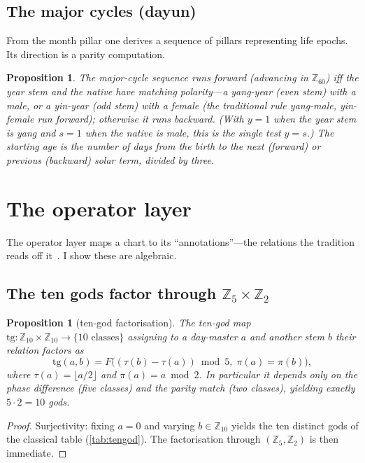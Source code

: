 \documentclass[11pt,a4paper]{article}
\newtheorem{proposition}[theorem]{Proposition}
\theoremstyle{definition}
\theoremstyle{remark}
\newcommand{\Z}{\mathbb{Z}}
\begin{document}
\subsection{The major cycles (dayun)}
From the month pillar one derives a sequence of pillars representing life epochs. Its direction is a parity computation.

\begin{proposition}\label{prop:dayun}
The major-cycle sequence runs forward (advancing in $\Z_{60}$) iff the year stem and the native have matching polarity---a yang-year (even stem) with a male, or a yin-year (odd stem) with a female (the traditional rule \emph{yang-male, yin-female run forward}); otherwise it runs backward. (With $y=1$ when the year stem is yang and $s=1$ when the native is male, this is the single test $y=s$.) The starting age is the number of days from the birth to the next (forward) or previous (backward) solar term, divided by three.
\end{proposition}

\section{The operator layer}\label{sec:operators}

The operator layer maps a chart to its ``annotations''---the relations the tradition reads off it~\cite{yuanhai}. I show these are algebraic.

\subsection{The ten gods factor through \texorpdfstring{$\Z_5\times\Z_2$}{Z5xZ2}}

\begin{proposition}[ten-god factorisation]\label{prop:tengod}
The \emph{ten-god} map $\mathrm{tg}:\Z_{10}\times\Z_{10}\to\{\text{10 classes}\}$ assigning to a day-master $a$ and another stem $b$ their relation factors as
\[
\mathrm{tg}(a,b)=F\big((\tau(b)-\tau(a))\bmod 5,\;\pi(a)=\pi(b)\big),
\]
where $\tau(a)=\lfloor a/2\rfloor$ and $\pi(a)=a\bmod 2$. In particular it depends only on the phase difference (five classes) and the parity match (two classes), yielding exactly $5\cdot 2=10$ gods.
\end{proposition}
\begin{proof}
Surjectivity: fixing $a=0$ and varying $b\in\Z_{10}$ yields the ten distinct gods of the classical table (\cref{tab:tengod}). The factorisation through $(\Z_5,\Z_2)$ is then immediate.
\end{proof}
\end{document}
